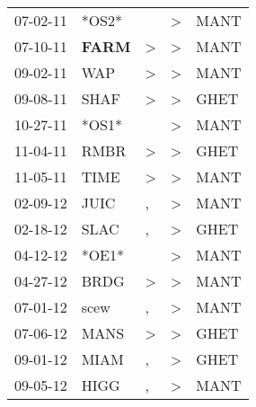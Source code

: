 \begin{supertabular}{p{0.07\textwidth}p{0.06\textwidth}p{0.02\textwidth}p{0.02\textwidth}p{0.06\textwidth}}
          07-02-11\textsuperscript{} &                            *OS2* &                  &  \textgreater &           MANT\textsuperscript{} \\
          07-10-11\textsuperscript{} &  \textbf{FARM\textsuperscript{}} &     \textgreater &  \textgreater &           MANT\textsuperscript{} \\
          09-02-11\textsuperscript{} &            WAP\textsuperscript{} &     \textgreater &  \textgreater &           MANT\textsuperscript{} \\
          09-08-11\textsuperscript{} &           SHAF\textsuperscript{} &     \textgreater &  \textgreater &           GHET\textsuperscript{} \\
          10-27-11\textsuperscript{} &                            *OS1* &                  &  \textgreater &           MANT\textsuperscript{} \\
          11-04-11\textsuperscript{} &           RMBR\textsuperscript{} &     \textgreater &  \textgreater &           GHET\textsuperscript{} \\
          11-05-11\textsuperscript{} &           TIME\textsuperscript{} &     \textgreater &  \textgreater &           MANT\textsuperscript{} \\
          02-09-12\textsuperscript{} &           JUIC\textsuperscript{} &                , &  \textgreater &           MANT\textsuperscript{} \\
          02-18-12\textsuperscript{} &           SLAC\textsuperscript{} &                , &  \textgreater &           GHET\textsuperscript{} \\
          04-12-12\textsuperscript{} &                            *OE1* &                  &  \textgreater &           MANT\textsuperscript{} \\
          04-27-12\textsuperscript{} &           BRDG\textsuperscript{} &     \textgreater &  \textgreater &           MANT\textsuperscript{} \\
          07-01-12\textsuperscript{} &           scew\textsuperscript{} &                , &  \textgreater &           MANT\textsuperscript{} \\
          07-06-12\textsuperscript{} &           MANS\textsuperscript{} &     \textgreater &  \textgreater &           GHET\textsuperscript{} \\
          09-01-12\textsuperscript{} &           MIAM\textsuperscript{} &                , &  \textgreater &           GHET\textsuperscript{} \\
          09-05-12\textsuperscript{} &           HIGG\textsuperscript{} &                , &  \textgreater &           MANT\textsuperscript{} \\

\end{supertabular}
